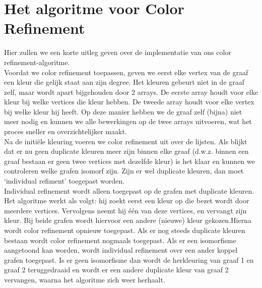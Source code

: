 \documentclass{article}
\begin{document}

\section{Het algoritme voor Color Refinement}
Hier zullen we een korte uitleg geven over de implementatie van ons color refinement-algoritme.\\

Voordat we color refinement toepassen, geven we eerst elke vertex van de graaf een kleur die gelijk staat aan zijn degree. Het kleuren gebeurt niet in de graaf zelf, maar wordt apart bijgehouden door 2 arrays. De eerste array houdt voor elke kleur bij welke vertices die kleur hebben. De tweede array houdt voor elke vertex bij welke kleur hij heeft. Op deze manier hebben we de graaf zelf (bijna) niet meer nodig en kunnen we alle bewerkingen op de twee arrays uitvoeren, wat het proces sneller en overzichtelijker maakt.\\
Na de initi\"ele kleuring voeren we color refinement uit over de lijsten. Als blijkt dat er nu geen duplicate kleuren meer zijn binnen elke graaf (d.w.z. binnen een graaf bestaan er geen twee vertices met dezelfde kleur) is het klaar en kunnen we controleren welke grafen isomorf zijn. Zijn er wel duplicate kleuren, dan moet `individual refiment' toegepast worden.\\

Individual refinement wordt alleen toegepast op de grafen met duplicate kleuren. Het algoritme werkt als volgt: hij zoekt eerst een kleur op die bezet wordt door meerdere vertices. Vervolgens neemt hij \'e\'en van deze vertices, en vervangt zijn kleur. Bij beide grafen wordt hiervoor een andere (nieuwe) kleur gekozen.Hierna wordt color refinement opnieuw toegepast. Als er nog steeds duplicate kleuren bestaan wordt color refinement nogmaals toegepast. Als er een isomorfisme aangetoond kan worden, wordt individual refinement over een ander koppel grafen toegepast. Is er geen isomorfisme dan wordt de herkleuring van graaf 1 en graaf 2 teruggedraaid en wordt er een andere duplicate kleur van graaf 2 vervangen, waarna het algoritme zich weer herhaalt.
\pagebreak

\end{document}

